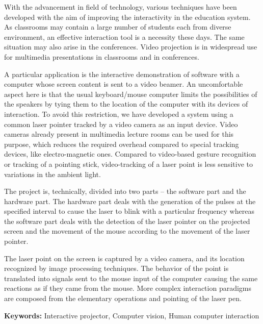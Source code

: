 	\vspace{0.5cm}	
        With the advancement in field of technology, various techniques have been developed with the aim of improving the interactivity in the education system. As classrooms may contain a large number of students each from diverse environment, an effective interaction tool is a necessity these days. The same situation may also arise in the conferences. Video projection is in widespread use for multimedia presentations in classrooms and in conferences. 

A particular application is the interactive demonstration of software with a computer whose screen content is sent to a video beamer. An uncomfortable aspect here is that the usual keyboard/mouse computer limits the possibilities of the speakers by tying them to the location of the computer with its devices of interaction. To avoid this restriction, we have developed a system using a common laser pointer tracked by a video camera as an input device. Video cameras already present in multimedia lecture rooms can be used for this purpose, which reduces the required overhead compared to special tracking devices, like electro-magnetic ones. Compared to video-based gesture recognition or tracking of a pointing stick, video-tracking of a laser point is less sensitive to variations in the ambient
light.

The project is, technically, divided into two parts – the software part and the hardware part. The hardware part deals with the generation of the pulses at the specified interval to cause the laser to blink with a particular frequency whereas the software part deals with the detection of the laser pointer on the projected screen and the movement of the mouse according to the movement of the laser pointer.

The laser point on the screen is captured by a video camera, and its location recognized by image processing techniques. The behavior of the point is translated into signals sent to the mouse input of the computer causing the same reactions as if they came from the mouse. More complex interaction paradigms are composed from the elementary operations  and pointing of the laser pen.

\noindent

\textbf{Keywords:} Interactive projector, Computer vision, Human computer interaction